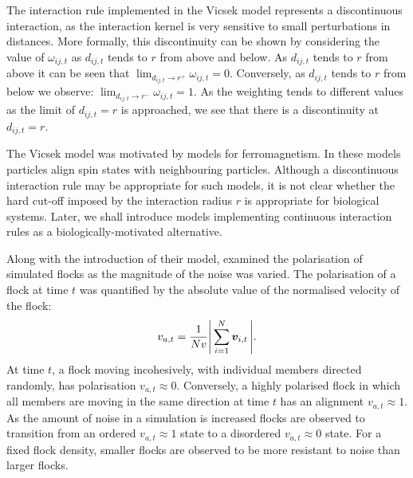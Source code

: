 The interaction rule implemented in the Vicsek model represents a discontinuous
interaction, as the interaction kernel is very sensitive to small perturbations in
distances.  More formally, this discontinuity can be shown by considering the value of
$\omega_{ij, t}$ as $d_{ij,t}$ tends to $r$ from above and below.  As $d_{ij,t}$ tends to
$r$ from above it can be seen that $\lim_{d_{ij,t} \rightarrow r^+} \omega_{ij,t} = 0$.
Conversely, as $d_{ij,t}$ tends to $r$ from below we observe: $\lim_{d_{ij,t} \rightarrow
r^-} \omega_{ij,t} = 1$. As the weighting tends to different values as the limit of
$d_{ij,t}=r$ is approached, we see that there is a discontinuity at $d_{ij,t}=r$.

The Vicsek model was motivated by models for ferromagnetism. In these models particles
align spin states with neighbouring particles. Although a discontinuous interaction rule
may be appropriate for such models, it is not clear whether the hard cut-off imposed by
the interaction radius $r$ is appropriate for biological systems. Later, we shall
introduce models implementing continuous interaction rules as a biologically-motivated
alternative.

Along with the introduction of their model, \cite{vicsek95} examined the polarisation of
simulated flocks as the magnitude of the noise was varied. The polarisation of a flock at
time $t$ was quantified by the absolute value of the normalised velocity of the flock:
\begin{equation}
    v_{a,t} = \frac{1}{Nv} \abs{\,\sum_{i=1}^N \bm{v}_{i,t}\,}.
\end{equation}
At time $t$, a flock moving incohesively, with individual members directed randomly, has
polarisation $v_{a,t}\approx0$. Conversely, a highly polarised flock in which all members
are moving in the same direction at time $t$ has an alignment $v_{a,t}\approx1$. As the
amount of noise in a simulation is increased flocks are observed to transition from an
ordered $v_{a,t}\approx1$ state to a disordered $v_{a,t}\approx0$ state. For a fixed flock
density, smaller flocks are observed to be more resistant to noise than larger flocks.

